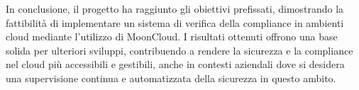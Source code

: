 In conclusione, il progetto ha raggiunto gli obiettivi prefissati, dimostrando la fattibilità di implementare un sistema di verifica della compliance in ambienti cloud mediante l'utilizzo di MoonCloud. I risultati ottenuti offrono una base solida per ulteriori sviluppi, contribuendo a rendere la sicurezza e la compliance nel cloud più accessibili e gestibili, anche in contesti aziendali dove si desidera una supervisione continua e automatizzata della sicurezza in questo ambito.
